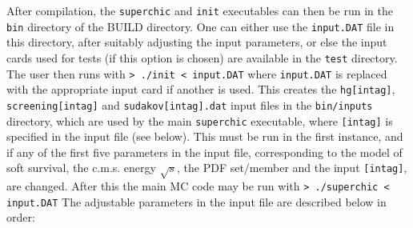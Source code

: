 \documentclass[12pt]{article}
\begin{document}
After compilation, the  \texttt{superchic} and \texttt{init} executables
 can then be run in the \texttt{bin} directory of the BUILD directory. One can either use the 
 \texttt{input.DAT} file in this directory, after suitably adjusting the input parameters, or else the input cards used for tests (if this option is chosen) are available in the \texttt{test} directory. The user then runs with
\newline
\newline
\texttt{> ./init < input.DAT}
\newline
\newline
where  \texttt{input.DAT} is replaced with the appropriate input card if another is used.
This creates the \texttt{hg[intag]}, \texttt{screening[intag]} and 
\texttt{sudakov[intag]}\texttt{.dat} input files in the 
\texttt{bin/inputs} directory, which are used by the main 
\texttt{superchic} executable, where \texttt{[intag]} is specified in 
the input file (see below). This must be run in the first instance, and 
if any of the first five parameters in the input file, corresponding to 
the model of soft survival, the c.m.s. energy $\sqrt{s}$, the PDF 
set/member and the input \texttt{[intag]}, are changed. After this the 
main MC code may be run with
\newline
\newline
\texttt{> ./superchic < input.DAT}
\newline
\newline
The adjustable parameters in the input file are described below in order:
\end{document}
